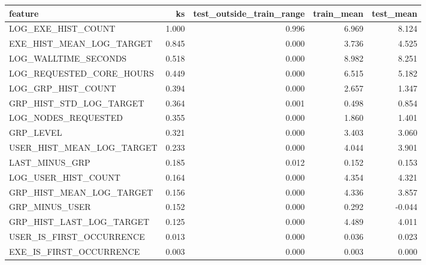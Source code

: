 \begin{tabular}{lrrrr}
\toprule
feature & ks & test_outside_train_range & train_mean & test_mean \\
\midrule
LOG_EXE_HIST_COUNT & 1.000 & 0.996 & 6.969 & 8.124 \\
EXE_HIST_MEAN_LOG_TARGET & 0.845 & 0.000 & 3.736 & 4.525 \\
LOG_WALLTIME_SECONDS & 0.518 & 0.000 & 8.982 & 8.251 \\
LOG_REQUESTED_CORE_HOURS & 0.449 & 0.000 & 6.515 & 5.182 \\
LOG_GRP_HIST_COUNT & 0.394 & 0.000 & 2.657 & 1.347 \\
GRP_HIST_STD_LOG_TARGET & 0.364 & 0.001 & 0.498 & 0.854 \\
LOG_NODES_REQUESTED & 0.355 & 0.000 & 1.860 & 1.401 \\
GRP_LEVEL & 0.321 & 0.000 & 3.403 & 3.060 \\
USER_HIST_MEAN_LOG_TARGET & 0.233 & 0.000 & 4.044 & 3.901 \\
LAST_MINUS_GRP & 0.185 & 0.012 & 0.152 & 0.153 \\
LOG_USER_HIST_COUNT & 0.164 & 0.000 & 4.354 & 4.321 \\
GRP_HIST_MEAN_LOG_TARGET & 0.156 & 0.000 & 4.336 & 3.857 \\
GRP_MINUS_USER & 0.152 & 0.000 & 0.292 & -0.044 \\
GRP_HIST_LAST_LOG_TARGET & 0.125 & 0.000 & 4.489 & 4.011 \\
USER_IS_FIRST_OCCURRENCE & 0.013 & 0.000 & 0.036 & 0.023 \\
EXE_IS_FIRST_OCCURRENCE & 0.003 & 0.000 & 0.003 & 0.000 \\
\bottomrule
\end{tabular}
